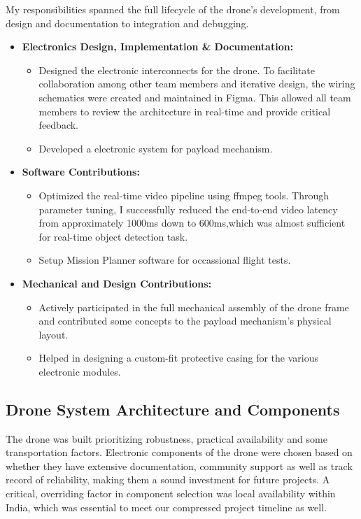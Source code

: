 My responsibilities spanned the full lifecycle of the drone's development, from design and documentation to integration and debugging.

\noindent
\begin{itemize}
	\item \textbf{Electronics Design, Implementation \& Documentation:}
	      \begin{itemize}
		      \item Designed the electronic interconnects for the drone. To facilitate collaboration among other team members and iterative design, the wiring schematics were created and maintained in Figma. This allowed all team members to review the architecture in real-time and provide critical feedback.
		      \item Developed a electronic system for payload mechanism.
	      \end{itemize}
	\item  \textbf{Software Contributions:}
	      \begin{itemize}
		      \item Optimized the real-time video pipeline using ffmpeg tools. Through parameter tuning, I successfully reduced the end-to-end video latency from approximately 1000ms down to 600ms,which was almost sufficient for real-time object detection task.
		      \item Setup Mission Planner software for occassional flight tests.
	      \end{itemize}

	\item \textbf{Mechanical and Design Contributions:}
	      \begin{itemize}
		      \item Actively participated in the full mechanical assembly of the drone frame and contributed some concepts to the payload mechanism's physical layout.
		      \item Helped in designing a custom-fit protective casing for the various electronic modules.
	      \end{itemize}
\end{itemize}


\subsection{Drone System Architecture and Components}

The drone was built prioritizing robustness, practical availability and some transportation factors. Electronic components of the drone were chosen based on whether they have extensive documentation, community support as well as track record of reliability, making them a sound investment for future projects. A critical, overriding factor in component selection was local availability within India, which was essential to meet our compressed project timeline as well.

